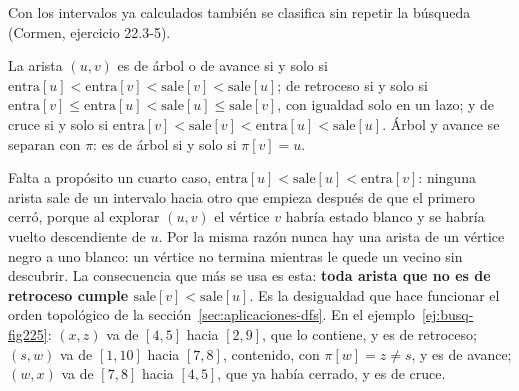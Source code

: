 \documentclass[11pt,letterpaper]{article}
\begin{document}
Con los intervalos ya calculados también se clasifica sin repetir la
búsqueda (Cormen, ejercicio 22.3-5).

\begin{proposicion}
  \label{prop:busq-intervalos}
  La arista $(u, v)$ es de árbol o de avance si y solo si
  $\text{entra}[u] < \text{entra}[v] < \text{sale}[v] < \text{sale}[u]$;
  de retroceso si y solo si
  $\text{entra}[v] \leq \text{entra}[u] < \text{sale}[u] \leq
  \text{sale}[v]$, con igualdad solo en un lazo; y de cruce si y solo
  si $\text{entra}[v] < \text{sale}[v] < \text{entra}[u] <
  \text{sale}[u]$. Árbol y avance se separan con $\pi$: es de árbol si
  y solo si $\pi[v] = u$.
\end{proposicion}

Falta a propósito un cuarto caso,
$\text{entra}[u] < \text{sale}[u] < \text{entra}[v]$: ninguna arista
sale de un intervalo hacia otro que empieza después de que el primero
cerró, porque al explorar $(u, v)$ el vértice $v$ habría estado blanco
y se habría vuelto descendiente de $u$. Por la misma razón nunca hay
una arista de un vértice negro a uno blanco: un vértice no termina
mientras le quede un vecino sin descubrir. La consecuencia que más se
usa es esta: \textbf{toda arista que no es de retroceso cumple
$\text{sale}[v] < \text{sale}[u]$}. Es la desigualdad que hace
funcionar el orden topológico de la sección~\ref{sec:aplicaciones-dfs}.
En el ejemplo~\ref{ej:busq-fig225}: $(x, z)$ va de $[4, 5]$ hacia
$[2, 9]$, que lo contiene, y es de retroceso; $(s, w)$ va de $[1, 10]$
hacia $[7, 8]$, contenido, con $\pi[w] = z \neq s$, y es de avance;
$(w, x)$ va de $[7, 8]$ hacia $[4, 5]$, que ya había cerrado, y es de
cruce.
\end{document}
